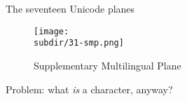 \documentclass[../index.tex]{subfiles}
\begin{document}
\renewcommand{\currenttitle}{The seventeen Unicode planes}
\begin{frame}{\currenttitle}
%
  \vspace*{1em}
  \begin{figure}
    \centering
    \texttt{[image: \\subdir/31-smp.png]}
    \caption{Supplementary Multilingual Plane}
  \end{figure}
\end{frame}

\begin{frame}[standout]
%
%
%
  Problem: what \textit{is} a character, anyway?
\end{frame}
\end{document}
